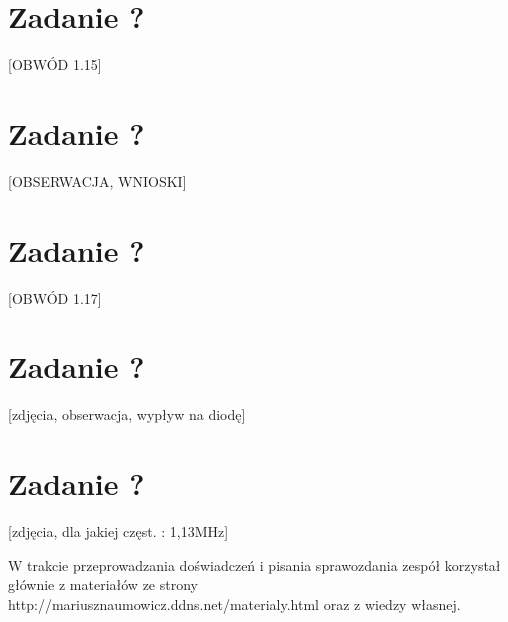 \documentclass[polish,a4paper]{article}
\begin{document}
\section{Zadanie ?}
[OBWÓD 1.15]

\section{Zadanie ?}
[OBSERWACJA, WNIOSKI]

\section{Zadanie ?}
[OBWÓD 1.17]

\section{Zadanie ?}
[zdjęcia, obserwacja, wypływ na diodę]

\section{Zadanie ?}
[zdjęcia, dla jakiej częst. : 1,13MHz]





\begin{thebibliography}{9}

  W trakcie przeprowadzania doświadczeń i pisania sprawozdania zespół korzystał głównie z materiałów ze strony http://mariusznaumowicz.ddns.net/materialy.html oraz z wiedzy własnej.

\end{thebibliography}
\end{document}
